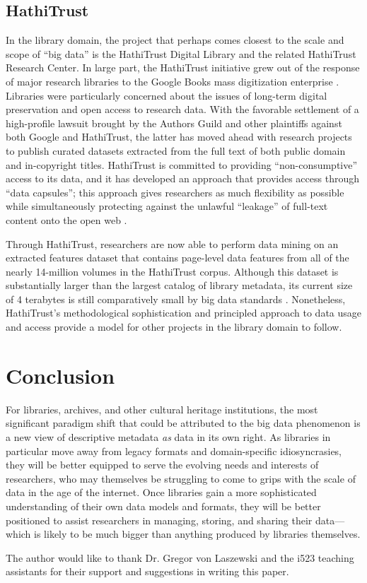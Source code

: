 \documentclass[sigconf]{acmart}
\begin{document}
\subsection{HathiTrust}
In the library domain, the project that perhaps comes closest to the scale and scope of ``big data'' is the HathiTrust Digital Library and the related HathiTrust Research Center. In large part, the HathiTrust initiative grew out of the response of major research libraries to the Google Books mass digitization enterprise \cite{hC10, bP13, jZ14}. Libraries were particularly concerned about the issues of long-term digital preservation and open access to research data. With the favorable settlement of a high-profile lawsuit brought by the Authors Guild and other plaintiffs against both Google and HathiTrust, the latter has moved ahead with research projects to publish curated datasets extracted from the full text of both public domain and in-copyright titles. HathiTrust is committed to providing ``non-consumptive'' access to its data, and it has developed an approach that provides access through ``data capsules''; this approach gives researchers as much flexibility as possible while simultaneously protecting against the unlawful ``leakage'' of full-text content onto the open web \cite{jZ14}.

Through HathiTrust, researchers are now able to perform data mining on an extracted features dataset that contains page-level data features from all of the nearly 14-million volumes in the HathiTrust corpus. Although this dataset is substantially larger than the largest catalog of library metadata, its current size of 4 terabytes is still comparatively small by big data standards \cite{hT17}. Nonetheless, HathiTrust's methodological sophistication and principled approach to data usage and access provide a model for other projects in the library domain to follow.

\section{Conclusion}
For libraries, archives, and other cultural heritage institutions, the most significant paradigm shift that could be attributed to the big data phenomenon is a new view of descriptive metadata \emph{as} data in its own right. As libraries in particular move away from legacy formats and domain-specific idiosyncrasies, they will be better equipped to serve the evolving needs and interests of researchers, who may themselves be struggling to come to grips with the scale of data in the age of the internet. Once libraries gain a more sophisticated understanding of their own data models and formats, they will be better positioned to assist researchers in managing, storing, and sharing their data---which is likely to be much bigger than anything produced by libraries themselves.

\begin{acks}
The author would like to thank Dr. Gregor von Laszewski and the i523 teaching assistants for their support and suggestions in writing this paper.
\end{acks}


 
\end{document}
